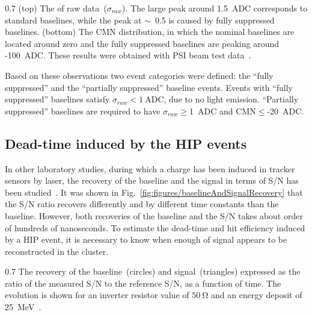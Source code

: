                  {0.7}       %
                 {(top) The \SD of raw data~($\sigma_{raw}$). The large peak around 1.5~ADC corresponds to standard baselines, while the peak at $\sim$~0.5 is caused by fully suppressed baselines. (bottom) The CMN distribution, in which the nominal baselines are located around zero and the fully suppressed baselines are peaking around -100~ADC. These results were obtained with PSI beam test data~\cite{Bainbridge:2004jc}.} %

Based on these observations two event categories were defined: the ``fully suppressed'' and the ``partially suppressed'' baseline events. Events with ``fully suppressed'' baselines satisfy $\sigma_{raw}< 1~\mathrm{ADC}$, due to no light emission. ``Partially suppressed'' baselines are required to have $\sigma_{raw}\geq$1~ADC and CMN$\leq$-20~ADC.

\subsection{Dead-time induced by the HIP events~\label{sec:deadtimePast}}

In other laboratory studies, during which a charge has been induced in tracker sensors by laser, the recovery of the  baseline and the signal in terms of S/N has been studied~\cite{Adam:2005pz}. It was shown in Fig.~\ref{fig:figures/baselineAndSignalRecovery} that the S/N ratio recovers differently and by different time constants than the baseline. However, both recoveries of the baseline and the S/N takes about order of hundreds of nanoseconds. To estimate the dead-time and hit efficiency induced by a HIP event, it is necessary to know when enough of signal appears to be reconstructed in the cluster.

                 {0.7}       %
                 {The recovery of the baseline~(circles) and signal~(triangles) expressed as the ratio of the measured S/N to the reference S/N, as a function of time. The evolution is shown for an inverter resistor value of $50~\mathrm{\Omega}$ and an energy deposit of 25~MeV~\cite{Adam:2005pz}.} %

